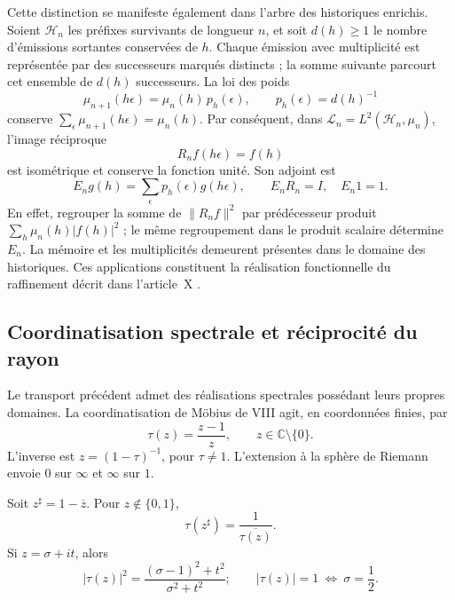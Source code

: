 Cette distinction se manifeste également dans l'arbre des historiques enrichis. Soient \(\mathcal H_n\) les préfixes survivants de longueur \(n\), et soit \(d(h)\geq1\) le nombre d'émissions sortantes conservées de \(h\). Chaque émission avec multiplicité est représentée par des successeurs marqués distincts ; la somme suivante parcourt cet ensemble de \(d(h)\) successeurs. La loi des poids
\[
 \mu_{n+1}(h\epsilon)=\mu_n(h)\,p_h(\epsilon),
 \qquad p_h(\epsilon)=d(h)^{-1}
\]
conserve \(\sum_{\epsilon}\mu_{n+1}(h\epsilon)=\mu_n(h)\). Par conséquent, dans \(\mathscr L_n=L^2(\mathcal H_n,\mu_n)\), l'image réciproque
\[
 R_nf(h\epsilon)=f(h)
\]
est isométrique et conserve la fonction unité. Son adjoint est
\[
 E_ng(h)=\sum_{\epsilon}p_h(\epsilon)g(h\epsilon),
 \qquad E_nR_n=I,\quad E_n1=1.
\]
En effet, regrouper la somme de \(\|R_nf\|^2\) par prédécesseur produit \(\sum_h\mu_n(h)|f(h)|^2\) ; le même regroupement dans le produit scalaire détermine \(E_n\). La mémoire et les multiplicités demeurent présentes dans le domaine des historiques. Ces applications constituent la réalisation fonctionnelle du raffinement décrit dans l'article~X \cite{hmtX}.

\subsection{Coordinatisation spectrale et réciprocité du rayon}

Le transport précédent admet des réalisations spectrales possédant leurs propres domaines. La coordinatisation de Möbius de VIII agit, en coordonnées finies, par
\begin{equation}
 \tau(z)=\frac{z-1}{z},
 \qquad z\in\mathbb C\setminus\{0\}.
 \label{nt:mobius}
\end{equation}
L'inverse est \(z=(1-\tau)^{-1}\), pour \(\tau\ne1\). L'extension à la sphère de Riemann envoie \(0\) sur \(\infty\) et \(\infty\) sur \(1\).

\begin{proposition}
Soit \(z^\sharp=1-\overline z\). Pour
\(z\notin\{0,1\}\),
\begin{equation}
 \tau(z^\sharp)=\frac1{\overline{\tau(z)}}.
 \label{nt:mirror}
\end{equation}
Si \(z=\sigma+it\), alors
\begin{equation}
 |\tau(z)|^2
 =\frac{(\sigma-1)^2+t^2}{\sigma^2+t^2};
 \qquad
 |\tau(z)|=1\ \Longleftrightarrow\ \sigma=\frac12.
 \label{nt:critical-circle}
\end{equation}
\end{proposition}

